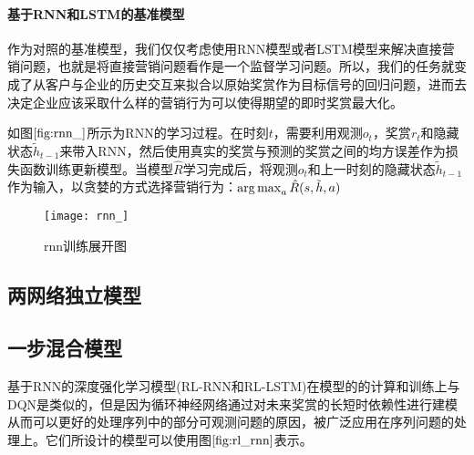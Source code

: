 


 \paragraph{基于RNN和LSTM的基准模型}
 作为对照的基准模型，我们仅仅考虑使用RNN模型或者LSTM模型来解决直接营销问题，也就是将直接营销问题看作是一个监督学习问题。所以，我们的任务就变成了从客户与企业的历史交互来拟合以原始奖赏作为目标信号的回归问题，进而去决定企业应该采取什么样的营销行为可以使得期望的即时奖赏最大化。

 如图$\ref{fig:rnn_}$所示为RNN的学习过程。在时刻$t$，需要利用观测$o_{t}$，奖赏$r_{t}$和隐藏状态$\tilde{h}_{t-1}$来带入RNN，然后使用真实的奖赏与预测的奖赏之间的均方误差作为损失函数训练更新模型。当模型$\hat{R}$学习完成后，将观测$o_{t}$和上一时刻的隐藏状态$\tilde{h}_{t-1}$作为输入，以贪婪的方式选择营销行为：$\operatorname*{arg\,max}_{a}\hat{R}(s,\tilde{h},a)$

\begin{figure}[htbp]
\centering
\texttt{[image: rnn\_]}
\caption{rnn训练展开图}
\label{fig:rnn_}
\end{figure}

\subsection{两网络独立模型}

\subsection{一步混合模型}
基于RNN的深度强化学习模型(RL-RNN和RL-LSTM)在模型的的计算和训练上与DQN是类似的，但是因为循环神经网络通过对未来奖赏的长短时依赖性进行建模从而可以更好的处理序列中的部分可观测问题的原因，被广泛应用在序列问题的处理上\citep{bakker2002reinforcement,hausknecht2015deep,lin1993reinforcement,narasimhan2015language}。它们所设计的模型可以使用图$\ref{fig:rl_rnn}$表示。

